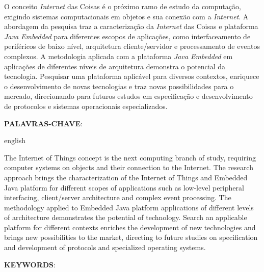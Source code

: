 \begin{resumo}

	O conceito \textit{Internet} das Coisas é o próximo ramo de estudo da computação, exigindo sistemas computacionais em objetos e sua conexão com a \textit{Internet}.
	A abordagem da pesquisa traz a caracterização da \textit{Internet} das Coisas e plataforma \textit{Java Embedded} para diferentes escopos de aplicações, como interfaceamento de periféricos de baixo nível, arquitetura cliente/servidor e processamento de eventos complexos.
	A metodologia aplicada com a plataforma \textit{Java Embedded} em aplicações de diferentes níveis de arquitetura demonstra o potencial da tecnologia.
	Pesquisar uma plataforma aplicável para diversos contextos, enriquece o desenvolvimento de novas tecnologias e traz novas possibilidades para o mercado, direcionando para futuros estudos em especificação e desenvolvimento de protocolos e sistemas operacionais especializados.

	\vspace{\onelineskip}
	\noindent
	\textbf{\uppercase{Palavras-chave}}: \palavraschave

\end{resumo}

\begin{resumo}[Abstract]

	\begin{otherlanguage*}{english}

		The Internet of Things concept is the next computing branch of study, requiring computer systems on objects and their connection to the Internet.
		The research approach brings the characterization of the Internet of 
		Things and Embedded Java platform for different scopes of applications 
		such as low-level peripheral interfacing, client/server architecture and 
		complex event processing.
		The methodology applied to Embedded Java platform applications of different levels of architecture demonstrates the potential of technology.
		Search an applicable platform for different contexts enriches the development of new technologies and brings new possibilities to the market, directing to future studies on specification and development of protocols and specialized operating systems.

		\vspace{\onelineskip}
		\noindent
		\textbf{\uppercase{Keywords}}: \keywords

	\end{otherlanguage*}

\end{resumo}
